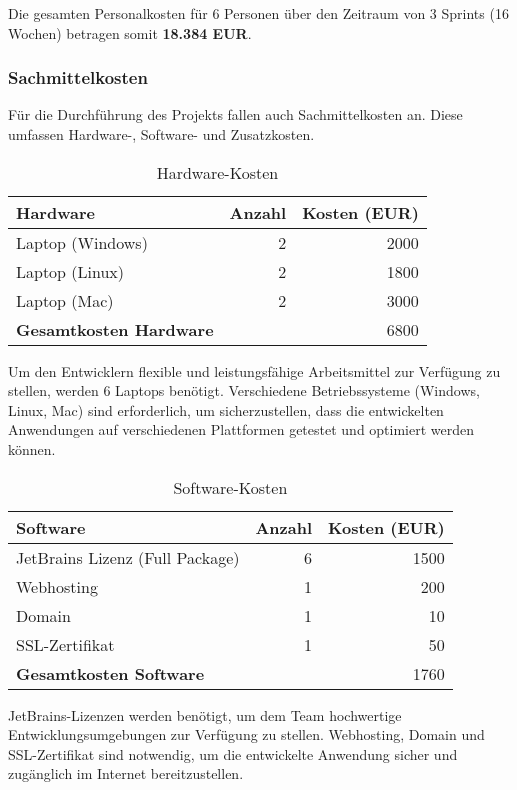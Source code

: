 Die gesamten Personalkosten für 6 Personen über den Zeitraum von 3 Sprints (16 Wochen) betragen somit \textbf{18.384 EUR}.

\subsubsection{Sachmittelkosten}\label{sachmittelkosten}

Für die Durchführung des Projekts fallen auch Sachmittelkosten an. Diese umfassen Hardware-, Soft\-ware- und Zusatzkosten.

\begin{table}[ht]
  \centering
  \begin{tabular}{lrr}
    \toprule
    \textbf{Hardware} & \textbf{Anzahl} & \textbf{Kosten (EUR)} \\
    \midrule
    Laptop (Windows) & 2 & 2000 \\
    Laptop (Linux) & 2 & 1800 \\
    Laptop (Mac) & 2 & 3000 \\
    \midrule
    \textbf{Gesamtkosten Hardware} & & 6800 \\
    \bottomrule
  \end{tabular}
  \caption{Hardware-Kosten}
\end{table}

Um den Entwicklern flexible und leistungsfähige Arbeitsmittel zur Verfügung zu stellen, werden 6 Laptops benötigt. Verschiedene Betriebssysteme (Windows, Linux, Mac) sind erforderlich, um sicherzustellen, dass die entwickelten Anwendungen auf verschiedenen Plattformen getestet und optimiert werden können.

\begin{table}[ht]
  \centering
  \begin{tabular}{lrr}
    \toprule
    \textbf{Software} & \textbf{Anzahl} & \textbf{Kosten (EUR)} \\
    \midrule
    JetBrains Lizenz (Full Package) & 6 & 1500 \\
    Webhosting & 1 & 200 \\
    Domain & 1 & 10 \\
    SSL-Zertifikat & 1 & 50 \\
    \midrule
    \textbf{Gesamtkosten Software} & & 1760 \\
    \bottomrule
  \end{tabular}
  \caption{Software-Kosten}
\end{table}

JetBrains-Lizenzen werden benötigt, um dem Team hochwertige Entwicklungsumgebungen zur Verfügung zu stellen. Webhosting, Domain und SSL-Zertifikat sind notwendig, um die entwickelte Anwendung sicher und zugänglich im Internet bereitzustellen.

